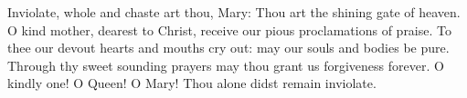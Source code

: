 \begin{otherlanguage}{english}Inviolate, whole and chaste art thou, Mary:
Thou art the shining gate of heaven.
O kind mother, dearest to Christ,
receive our pious proclamations of praise.
To thee our devout hearts and mouths cry out:
may our souls and bodies be pure.
Through thy sweet sounding prayers
may thou grant us forgiveness forever.
O kindly one! O Queen! O Mary!
Thou alone didst remain inviolate.\end{otherlanguage}